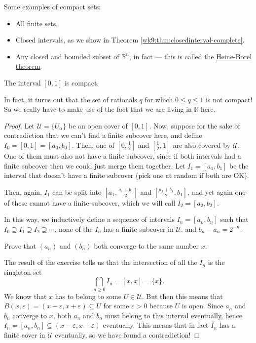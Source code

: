 \documentclass[10pt]{scrartcl}
\providecommand{\eps}{\varepsilon}
\providecommand{\half}{\frac{1}{2}}
\providecommand{\RR}{\mathbb R}
\providecommand{\ii}{\item}
\begin{document}
\begin{example}
	Some examples of compact sets:
	\begin{itemize}
		\ii All finite sets.
		\ii Closed intervals, as we show in
		Theorem \ref{wk9:thm:closedinterval-complete}.
		\ii Any closed and bounded subset of $\RR^n$, in fact ---
		this is called the \hyperref[wk9:thm:heine-borel]{Heine-Borel theorem}.
	\end{itemize}
\end{example}

\begin{theorem}\label{wk9:thm:closedinterval-complete}
	The interval $[0,1]$ is compact.
\end{theorem}

\begin{remark}
	In fact, it turns out that the set of rationals $q$
	for which $0 \le q\le 1$ is not compact!
	So we really have to make use of the fact that
	we are living in $\RR$ here.
\end{remark}

\begin{proof}
	Let $\mathcal{U} = \{U_\alpha\}$ be an open cover of $[0,1]$.
	Now, suppose for the sake of contradiction that we can't
	find a finite subcover here, and define $I_0 = [0,1] = [a_0, b_0]$.
	Then, one of $[0,\half]$ and $[\half,1]$ are also covered by $\mathcal U$.
	One of them must also not
	have a finite subcover, since if both intervals
	had a finite subcover then we could just merge them together.
	Let $I_1 = [a_1, b_1]$ be the interval
	that doesn't have a finite subcover (pick one at random if both are OK).
	
	Then, again, $I_1$ can be split into $[a_1, \frac{a_1+b_1}{2}]$
	and $[\frac{a_1 + b_1}{2}, b_1]$, and yet again
	one of these cannot have a finite subcover,
	which we will call $I_2 = [a_2, b_2]$.
	
	In this way, we inductively define a sequence of intervals $I_n = [a_n,b_n]$
	such that $I_0\supseteq I_1\supseteq I_2\supseteq\cdots$,
	none of the $I_n$ has a finite subcover in $\mathcal U$, and
	$b_n - a_n = 2^{-n}$.
	
	\begin{exercise}
		Prove that $(a_n)$ and $(b_n)$ both converge
		to the same number $x$.
	\end{exercise}
	
	The result of the exercise tells us that
	the intersection of all the $I_n$ is the singleton set
	\[\bigcap_{n\ge0} I_n = [x,x] = \{x\}.\]
	We know that $x$ has to belong to some $U\in\mathcal U$.
	But then this means that $B(x,\eps) = (x-\eps,x+\eps)\subseteq U$
	for some $\eps>0$ because $U$ is open.
	Since $a_n$ and $b_n$ converge to $x$,
	both $a_n$ and $b_n$ must belong to this interval eventually,
	hence $I_n = [a_n,b_n]\subseteq(x-\eps,x+\eps)$ eventually.
	This means that in fact $I_n$ has a finite cover in $\mathcal U$
	eventually, so we have found a contradiction!
\end{proof}
\end{document}
